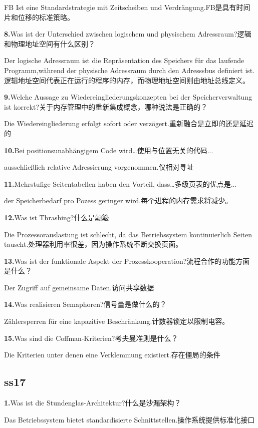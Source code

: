 \documentclass[fleqn]{article}
\begin{document}
FB Ist eine Standardstrategie mit Zeitscheiben und Verdrängung.FB是具有时间片和位移的标准策略。

\textbf{8.}Was ist der Unterschied zwischen logischem und physischem Adressraum?逻辑和物理地址空间有什么区别？

Der logische Adressraum ist die Repräsentation des Speichers für das laufende Programm,während der physische Adressraum durch den Adresssbus definiert ist.逻辑地址空间代表正在运行的程序的内存，而物理地址空间则由地址总线定义。

\textbf{9.}Welche Aussage zu Wiedereingliederungskonzepten bei der Speicherverwaltung ist korrekt?关于内存管理中的重新集成概念，哪种说法是正确的？

Die Wiedereingliederung erfolgt sofort oder verzögert.重新融合是立即的还是延迟的

\textbf{10.}Bei positionsunabhängigem Code wird…使用与位置无关的代码...

ausschließlich relative Adressierung vorgenommen.仅相对寻址

\textbf{11.}Mehrstufige Seitentabellen haben den Vorteil, dass…多级页表的优点是...

der Speicherbedarf pro Pozess geringer wird.每个进程的内存需求将减少。

\textbf{12.}Was ist Thrashing?什么是颠簸

Die Prozessorauslastung ist schlecht, da das Betriebssystem kontinuierlich Seiten tauscht.处理器利用率很差，因为操作系统不断交换页面。

\textbf{13.}Was ist der funktionale Aspekt der Prozesskooperation?流程合作的功能方面是什么？

Der Zugriff auf gemeinsame Daten.访问共享数据

\textbf{14.}Was realisieren Semaphoren?信号量是做什么的？

Zählersperren für eine kapazitive Beschränkung.计数器锁定以限制电容。

\textbf{15.}Was sind die Coffman-Kriterien?考夫曼准则是什么？

Die Kriterien unter denen eine Verklemmung existiert.存在僵局的条件

\subsection{ss17}

\textbf{1.}Was ist die Stundenglas-Architektur?什么是沙漏架构？

Das Betriebssystem bietet standardisierte Schnittstellen.操作系统提供标准化接口
\end{document}
